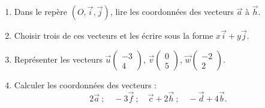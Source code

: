\exo
\begin{enumerate}


\item Dans le repère $(O,\overrightarrow{i},\overrightarrow{j})$, lire les coordonnées des vecteurs $\overrightarrow{a}$ à $\overrightarrow{h}$.
\item Choisir trois de ces vecteurs et les écrire sous la forme $x\overrightarrow{i}+y\overrightarrow{j}$.
\item Représenter les vecteurs $\overrightarrow{u} \left( \begin{array}{c}
-3\\
4
\end{array} \right)$, $\overrightarrow{v} \left( \begin{array}{c}
0\\
5
\end{array} \right)$, $\overrightarrow{w} \left( \begin{array}{c}
-2\\
2
\end{array} \right)$.
\item Calculer les coordonnées des vecteurs :
\[
2\overrightarrow{a}\ ;\quad -3\overrightarrow{f}\ ;\quad \overrightarrow{c}+2\overrightarrow{h}\ ;\quad -\overrightarrow{d}+4\overrightarrow{b}.
\]

\end{enumerate}
